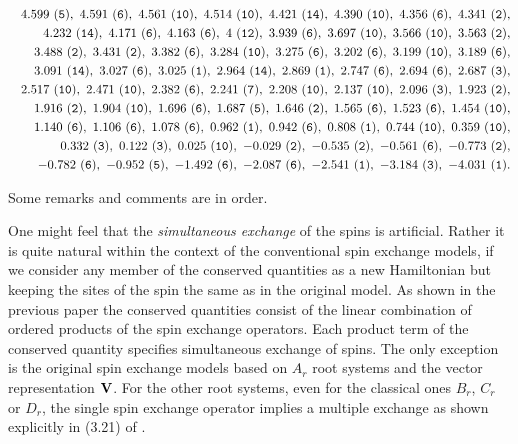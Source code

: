 \documentclass[a4paper,12pt]{article}
\begin{document}
\begin{eqnarray}
&&4.599  \ ({\tt 5 }),\
4.591  \ ({\tt 6 }),\
4.561  \ ({\tt 10 }),\
4.514  \ ({\tt 10 }),\
4.421  \ ({\tt 14 }),\
4.390  \ ({\tt 10 }),\
4.356  \ ({\tt 6 }),\
4.341    \ ({\tt 2 }),\nonumber\\
&&4.232  \  ({\tt 14 }),\ 4.171
\  ({\tt 6 }),\
4.163  \  ({\tt 6 }),\
4  \  ({\tt 12 }),\
3.939  \  ({\tt 6 }),\
3.697  \  ({\tt 10 }),\
3.566  \  ({\tt 10 }),\
3.563  \  ({\tt 2 }),\nonumber\\
&&3.488  \  ({\tt 2 }),\
3.431  \  ({\tt 2 }),\
3.382  \  ({\tt 6 }),\
3.284  \  ({\tt 10 }),\
3.275  \  ({\tt 6 }),\
3.202  \  ({\tt 6 }),\
3.199  \  ({\tt 10 }),\
3.189  \  ({\tt 6 }),\nonumber\\
&&3.091  \  ({\tt 14 }),\
3.027  \  ({\tt 6 }),\
3.025  \  ({\tt 1 }),\
2.964  \  ({\tt 14 }),\
2.869  \  ({\tt 1 }),\
2.747  \  ({\tt 6 }),\
2.694  \  ({\tt 6 }),\
2.687  \  ({\tt 3 }),\nonumber\\
&&2.517  \  ({\tt 10 }),\
2.471  \  ({\tt 10 }),\
2.382  \  ({\tt 6 }),\
2.241  \  ({\tt 7 }),\
2.208  \  ({\tt 10 }),\
2.137  \  ({\tt 10 }),\
2.096  \  ({\tt 3 }),\
1.923  \  ({\tt 2 }),\nonumber\\
&&1.916  \  ({\tt 2 }),\
1.904  \  ({\tt 10 }),\
1.696  \  ({\tt 6 }),\
1.687  \  ({\tt 5 }),\
1.646  \  ({\tt 2 }),\
1.565  \  ({\tt 6 }),\
1.523  \  ({\tt 6 }),\
1.454  \  ({\tt 10 }),\nonumber\\
&&1.140  \  ({\tt 6 }),\
1.106  \  ({\tt 6 }),\
1.078  \  ({\tt 6 }),\
0.962  \  ({\tt 1 }),\
0.942  \  ({\tt 6 }),\
0.808  \  ({\tt 1 }),\
0.744  \  ({\tt 10 }),\
0.359  \  ({\tt 10 }),\nonumber\\
&&0.332  \  ({\tt 3 }),\
0.122  \  ({\tt 3 }),\
0.025  \  ({\tt 10 }),\
-0.029  \  ({\tt 2 }),\
-0.535  \  ({\tt 2 }),\
-0.561  \  ({\tt 6 }),\
-0.773  \  ({\tt 2 }),\nonumber\\
&&-0.782  \  ({\tt 6 }),\
-0.952  \  ({\tt 5 }),\
-1.492  \  ({\tt 6 }),\
-2.087  \  ({\tt 6 }),\
-2.541  \  ({\tt 1 }),\
-3.184  \  ({\tt 3 }),\
-4.031  \  ({\tt 1 }).\nonumber\\
\label{a9vec}
\label{a9v}
\end{eqnarray}

\bigskip
Some remarks and comments are in order.

One might feel that the
{\em simultaneous exchange}  of the spins is artificial.
Rather it is  quite
natural within the context of the conventional spin exchange models, if we
consider any member of the conserved quantities as a new
Hamiltonian but keeping
the sites of the spin the same as in the original model.
As shown in the previous paper \cite{is1} the conserved quantities consist
of the linear combination of ordered products of the spin exchange
operators.
Each product term of the conserved quantity specifies
simultaneous exchange of
spins. The only exception is the original
spin exchange models based on $A_r$ root
systems and the vector representation ${\bf V}$.
For the other root systems, even
for the classical ones $B_r$, $C_r$ or $D_r$,
the single spin exchange operator
implies a multiple exchange as shown explicitly in (3.21) of \cite{is1}.
\end{document}
